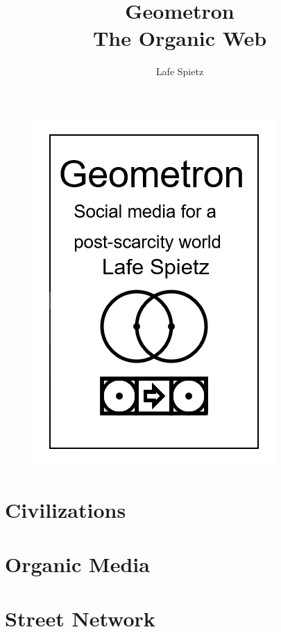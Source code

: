\documentclass[ebook,12pt,openany]{memoir} %
\title{Geometron \\ The Organic Web}
\author{Lafe Spietz}
\begin{document}
\frontmatter
\begin{figure}[htbp]
\centering
\includegraphics{cover.png}
\end{figure}

\clearpage

\clearpage

\newpage
\thispagestyle{empty}
\mbox{}

\maketitle

\tableofcontents

\listoffigures 

%

\mainmatter

\chapter{Civilizations}

\chapter{Organic Media}

\chapter{Street Network}

\end{document}

